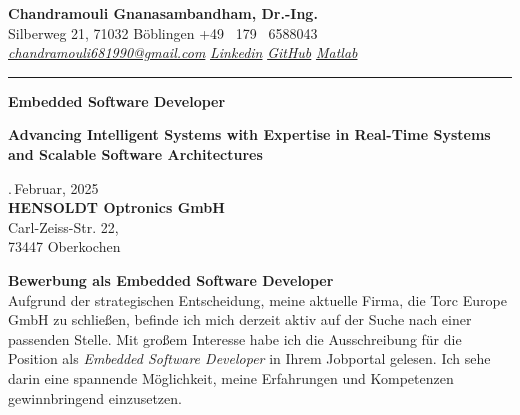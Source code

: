 \documentclass[a4paper,10pt]{article}
\newcommand{\link}[1]{{\textit{#1}}}
\begin{document}
\thispagestyle{plain}

\begin{center}
    {\Large \textbf{Chandramouli Gnanasambandham, Dr.-Ing.}}\\ 
    
    \vspace{0.2cm}
    \small Silberweg 21, 71032 B\"oblingen \hfill  \bullet  \hfill  +49 \ 179 \ 6588043 \hfill \bullet  \hfill
    \textup{\href{mailto:chandramouli681990@gmail.com}{\link{chandramouli681990@gmail.com}}} \hfill \bullet \hfill
    \textup{\href{https://www.linkedin.com/in/ganasambandhamc/}{\link{Linkedin}}} \hfill \bullet \hfill
    \textup{\href{https://github.com/chandramouli6890}{\link{GitHub}}} \hfill \bullet \hfill
    \textup{\href{https://de.mathworks.com/matlabcentral/profile/authors/4267772}{\link{Matlab}}}

    \vspace{-0.2cm}
    {\rule{\linewidth}{0.8pt}}

    \vspace{0.2cm}
    {\Large \textbf{Embedded Software Developer}}
    
    \vspace{0.1cm}
    \colorbox{gray!40}{%
        \parbox{0.99\textwidth}{%
        \centering \textcolor{highlightcolor}{\textbf{Advancing Intelligent Systems with Expertise in Real-Time Systems and Scalable Software Architectures}}
        }%
    }
\end{center}

\vspace{0.5cm}
.\,Februar, 2025\\

{\noindent
\textbf{HENSOLDT Optronics GmbH}\\
 Carl-Zeiss-Str. 22,\\
73447 Oberkochen\\
}

\noindent \textbf{Bewerbung als Embedded Software Developer} \\

\noindent Aufgrund der strategischen Entscheidung, meine aktuelle Firma, die
Torc Europe GmbH zu schließen, befinde ich mich derzeit aktiv auf der Suche
nach einer passenden Stelle. Mit großem Interesse habe ich die Ausschreibung
für die Position als \textit{Embedded Software Developer} in Ihrem Jobportal
gelesen. Ich sehe darin eine spannende Möglichkeit, meine Erfahrungen und
Kompetenzen gewinnbringend einzusetzen. \\
\end{document}
